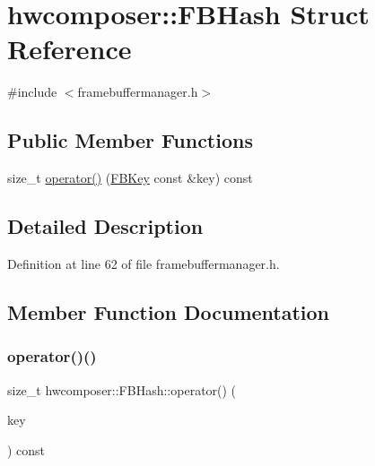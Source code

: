 \hypertarget{structhwcomposer_1_1FBHash}{}\section{hwcomposer\+:\+:F\+B\+Hash Struct Reference}
\label{structhwcomposer_1_1FBHash}


{\ttfamily \#include $<$framebuffermanager.\+h$>$}

\subsection*{Public Member Functions}
\begin{DoxyCompactItemize}
\item 
size\+\_\+t \mbox{\hyperlink{structhwcomposer_1_1FBHash_af4ac56dfeeeef744245c376b533bd359}{operator()}} (\mbox{\hyperlink{structFBKey}{F\+B\+Key}} const \&key) const
\end{DoxyCompactItemize}


\subsection{Detailed Description}


Definition at line 62 of file framebuffermanager.\+h.



\subsection{Member Function Documentation}
\mbox{\label{structhwcomposer_1_1FBHash_af4ac56dfeeeef744245c376b533bd359}} 
\subsubsection{\texorpdfstring{operator()()}{operator()()}}
{\footnotesize\ttfamily size\+\_\+t hwcomposer\+::\+F\+B\+Hash\+::operator() (\begin{DoxyParamCaption}\item[{\mbox{\hyperlink{structFBKey}{F\+B\+Key}} const \&}]{key }\end{DoxyParamCaption}) const\hspace{0.3cm}{\ttfamily [inline]}}




